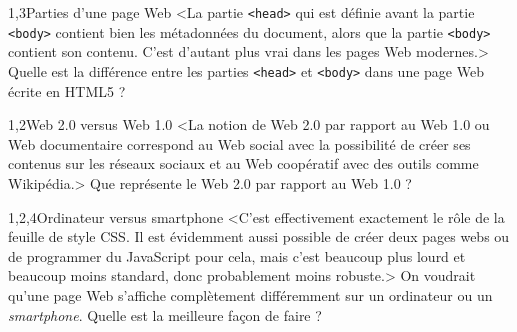 \begin{quiz}[title={Web et information}]
\begin{quizquestion*}[b]{2}{1,3}{Parties d'une page Web}
<La partie \texttt{<head>} qui est définie avant la partie \texttt{<body>} contient bien les métadonnées du document, alors que la partie \texttt{<body>} contient son contenu. C'est d'autant plus vrai dans les pages Web modernes.>
Quelle est la différence entre les parties \texttt{<head>} et \texttt{<body>} dans une page Web écrite en HTML5 ? 
\end{quizquestion*}

\begin{quizquestion*}[b]{3}{1,2}{Web 2.0 {\upshape versus} Web 1.0}
<La notion de Web 2.0 par rapport au Web 1.0 ou Web documentaire correspond au Web social avec la possibilité de créer ses contenus sur les réseaux sociaux et au Web coopératif avec des outils comme Wikipédia.>
Que représente le Web 2.0 par rapport au Web 1.0 ? 
\end{quizquestion*}

\begin{quizquestion*}[b]{3}{1,2,4}{Ordinateur {\upshape versus} {\upshape smartphone}}
<C’est effectivement exactement le rôle de la feuille de style CSS. Il est évidemment aussi possible de créer deux pages webs ou de programmer du JavaScript pour cela, mais c'est beaucoup plus lourd et beaucoup moins standard, donc probablement moins robuste.>
On voudrait qu’une page Web s’affiche complètement différemment sur un ordinateur ou un \textit{smartphone}. Quelle est la meilleure façon de faire ? 
\end{quizquestion*}


\end{quiz}

